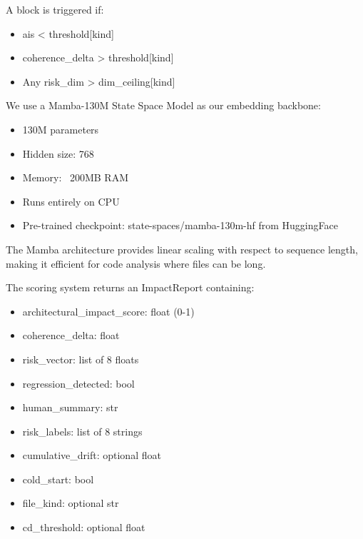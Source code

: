 A block is triggered if:
\begin{itemize}
    \item ais < threshold[kind]
    \item coherence_delta > threshold[kind]
    \item Any risk_dim > dim_ceiling[kind]
\end{itemize}


We use a Mamba-130M State Space Model as our embedding backbone:

\begin{itemize}
    \item 130M parameters
    \item Hidden size: 768
    \item Memory: ~200MB RAM
    \item Runs entirely on CPU
    \item Pre-trained checkpoint: state-spaces/mamba-130m-hf from HuggingFace
\end{itemize}

The Mamba architecture provides linear scaling with respect to sequence length, making it efficient for code analysis where files can be long.


The scoring system returns an ImpactReport containing:

\begin{itemize}
    \item architectural_impact_score: float (0-1)
    \item coherence_delta: float
    \item risk_vector: list of 8 floats
    \item regression_detected: bool
    \item human_summary: str
    \item risk_labels: list of 8 strings
    \item cumulative_drift: optional float
    \item cold_start: bool
    \item file_kind: optional str
    \item cd_threshold: optional float
\end{itemize}

